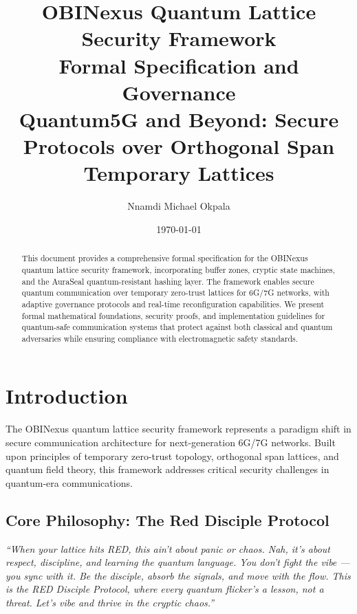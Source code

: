 \documentclass[12pt,a4paper]{article}
\title{OBINexus Quantum Lattice Security Framework\\
\large Formal Specification and Governance\\
\normalsize Quantum5G and Beyond: Secure Protocols over Orthogonal Span Temporary Lattices}
\author{Nnamdi Michael Okpala}
\date{\today}
\begin{document}
\maketitle

\begin{abstract}
This document provides a comprehensive formal specification for the OBINexus quantum lattice security framework, incorporating buffer zones, cryptic state machines, and the AuraSeal quantum-resistant hashing layer. The framework enables secure quantum communication over temporary zero-trust lattices for 6G/7G networks, with adaptive governance protocols and real-time reconfiguration capabilities. We present formal mathematical foundations, security proofs, and implementation guidelines for quantum-safe communication systems that protect against both classical and quantum adversaries while ensuring compliance with electromagnetic safety standards.
\end{abstract}

\tableofcontents
\newpage

\section{Introduction}

The OBINexus quantum lattice security framework represents a paradigm shift in secure communication architecture for next-generation 6G/7G networks. Built upon principles of temporary zero-trust topology, orthogonal span lattices, and quantum field theory, this framework addresses critical security challenges in quantum-era communications.

\subsection{Core Philosophy: The Red Disciple Protocol}

\begin{tcolorbox}[colback=red!10!white,colframe=red!80!black,title=Red Disciple Protocol Mindset]
\textit{``When your lattice hits RED, this ain't about panic or chaos. Nah, it's about respect, discipline, and learning the quantum language. You don't fight the vibe — you sync with it. Be the disciple, absorb the signals, and move with the flow. This is the RED Disciple Protocol, where every quantum flicker's a lesson, not a threat. Let's vibe and thrive in the cryptic chaos.''}
\end{tcolorbox}
\end{document}
